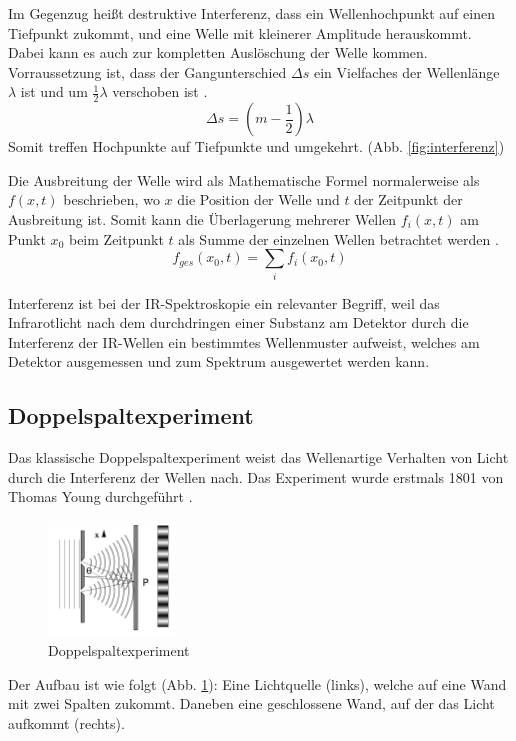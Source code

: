 \documentclass{article}
\begin{document}
Im Gegenzug heißt destruktive Interferenz, dass ein Wellenhochpunkt auf einen Tiefpunkt zukommt, und eine Welle mit kleinerer Amplitude herauskommt. Dabei kann es auch zur kompletten Auslöschung der Welle kommen. Vorraussetzung ist, dass der Gangunterschied $\Delta s$ ein Vielfaches der Wellenlänge $\lambda$ ist und um $\frac{1}{2} \lambda$ verschoben ist \cite{TODO}.
\begin{equation}
    \Delta s = (m - \frac{1}{2}) \lambda
\end{equation}
Somit treffen Hochpunkte auf Tiefpunkte und umgekehrt. (Abb. \ref{fig:interferenz})

Die Ausbreitung der Welle wird als Mathematische Formel normalerweise als $f(x, t)$ beschrieben, wo $x$ die Position der Welle und $t$ der Zeitpunkt der Ausbreitung ist. Somit kann die Überlagerung mehrerer Wellen $f_i(x, t)$ am Punkt $x_0$ beim Zeitpunkt $t$ als Summe der einzelnen Wellen betrachtet werden \cite{TODO}.
\begin{equation}
    f_{ges}(x_0, t) = \sum_{i}f_i(x_0, t)
\end{equation}

Interferenz ist bei der IR-Spektroskopie ein relevanter Begriff, weil das Infrarotlicht nach dem durchdringen einer Substanz am Detektor durch die Interferenz der IR-Wellen ein bestimmtes Wellenmuster aufweist, welches am Detektor ausgemessen und zum Spektrum ausgewertet werden kann. 

\newpage
\subsection{Doppelspaltexperiment}

Das klassische Doppelspaltexperiment weist das Wellenartige Verhalten von Licht durch die Interferenz der Wellen nach.
Das Experiment wurde erstmals 1801 von Thomas Young durchgeführt \cite{TODO}.

\begin{figure}
    \centering
    \includegraphics[width=0.3\textwidth]{doppelspalt.png}
    \caption{Doppelspaltexperiment \cite{TODO}}
    \label{fig:doppelspalt}
\end{figure}
Der Aufbau ist wie folgt (Abb. \ref{fig:doppelspalt}): Eine Lichtquelle (links), welche auf eine Wand mit zwei Spalten zukommt. Daneben eine geschlossene Wand, auf der das Licht aufkommt (rechts).
\end{document}

